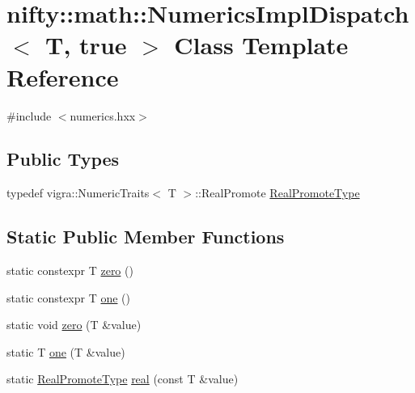 \hypertarget{classnifty_1_1math_1_1NumericsImplDispatch_3_01T_00_01true_01_4}{}\section{nifty\+:\+:math\+:\+:Numerics\+Impl\+Dispatch$<$ T, true $>$ Class Template Reference}
\label{classnifty_1_1math_1_1NumericsImplDispatch_3_01T_00_01true_01_4}


{\ttfamily \#include $<$numerics.\+hxx$>$}

\subsection*{Public Types}
\begin{DoxyCompactItemize}
\item 
typedef vigra\+::\+Numeric\+Traits$<$ T $>$\+::Real\+Promote \hyperlink{classnifty_1_1math_1_1NumericsImplDispatch_3_01T_00_01true_01_4_a3e74e0598758a7b5630fc2b0b0b96287}{Real\+Promote\+Type}
\end{DoxyCompactItemize}
\subsection*{Static Public Member Functions}
\begin{DoxyCompactItemize}
\item 
static constexpr T \hyperlink{classnifty_1_1math_1_1NumericsImplDispatch_3_01T_00_01true_01_4_a9b03d43866c3215a3350e253c405d340}{zero} ()
\item 
static constexpr T \hyperlink{classnifty_1_1math_1_1NumericsImplDispatch_3_01T_00_01true_01_4_ae8f6f7ad483adcd16c81f88b4ec81796}{one} ()
\item 
static void \hyperlink{classnifty_1_1math_1_1NumericsImplDispatch_3_01T_00_01true_01_4_aa8c1fee5ba420a6b2fce989b2b37a5d4}{zero} (T \&value)
\item 
static T \hyperlink{classnifty_1_1math_1_1NumericsImplDispatch_3_01T_00_01true_01_4_ad81280c38267c997ccc9794fa2611532}{one} (T \&value)
\item 
static \hyperlink{classnifty_1_1math_1_1NumericsImplDispatch_3_01T_00_01true_01_4_a3e74e0598758a7b5630fc2b0b0b96287}{Real\+Promote\+Type} \hyperlink{classnifty_1_1math_1_1NumericsImplDispatch_3_01T_00_01true_01_4_acff483acc0a49f49daee8fd39f007e45}{real} (const T \&value)
\end{DoxyCompactItemize}


